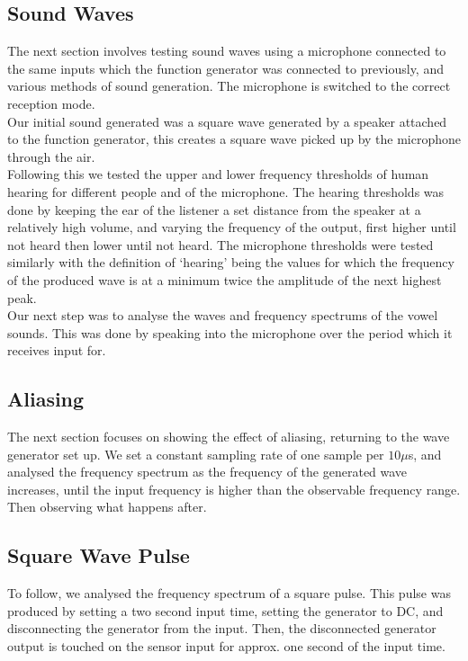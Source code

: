 \documentclass{article}
\begin{document}
\subsection{Sound Waves}
The next section involves testing sound waves	 using a microphone connected to the same inputs which the function generator was connected to previously, and various methods of sound generation. The microphone is switched to the correct reception mode.\\
\indent Our initial sound generated was a square wave generated by a speaker attached to the function generator, this creates a square wave picked up by the microphone through the air.\\
\indent Following this we tested the upper and lower frequency thresholds of human hearing for different people and of the microphone. The hearing thresholds was done by keeping the ear of the listener a set distance from the speaker at a relatively high volume, and varying the frequency of the output, first higher until not heard then lower until not heard. The microphone thresholds were tested similarly with the definition of `hearing' being the values for which the frequency of the produced wave is at a minimum twice the amplitude of the next highest peak.\\
\indent Our next step was to analyse the waves and frequency spectrums of the vowel sounds. This was done by speaking into the microphone over the period which it receives input for.\\
\subsection{Aliasing}
The next section focuses on showing the effect of aliasing, returning to the wave generator set up. We set a constant sampling rate of one sample per $10\mu$s, and analysed the frequency spectrum as the frequency of the generated wave increases, until the input frequency is higher than the observable frequency range. Then observing what happens after.
\subsection{Square Wave Pulse}
To follow, we analysed the frequency spectrum of a square pulse. This pulse was produced by setting a two second input time, setting the generator to DC, and disconnecting the generator from the input. Then, the disconnected generator output is touched on the sensor input for approx. one second of the input time. \\
\end{document}
